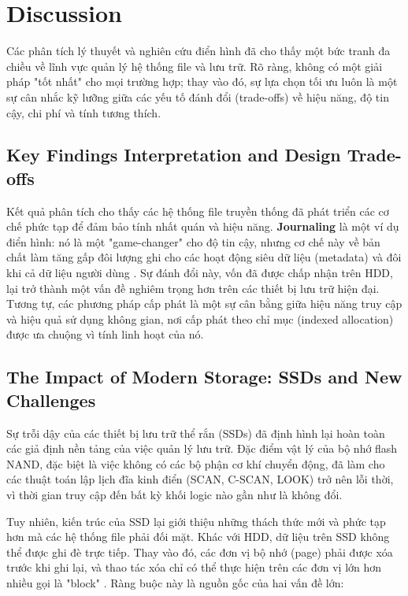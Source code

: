 \documentclass[12pt]{article}
\begin{document}

\section{Discussion}
Các phân tích lý thuyết và nghiên cứu điển hình đã cho thấy một bức tranh đa chiều về lĩnh vực quản lý hệ thống file và lưu trữ. Rõ ràng, không có một giải pháp "tốt nhất" cho mọi trường hợp; thay vào đó, sự lựa chọn tối ưu luôn là một sự cân nhắc kỹ lưỡng giữa các yếu tố đánh đổi (trade-offs) về hiệu năng, độ tin cậy, chi phí và tính tương thích.

\subsection{Key Findings Interpretation and Design Trade-offs}
Kết quả phân tích cho thấy các hệ thống file truyền thống đã phát triển các cơ chế phức tạp để đảm bảo tính nhất quán và hiệu năng. \textbf{Journaling} là một ví dụ điển hình: nó là một "game-changer" cho độ tin cậy, nhưng cơ chế này về bản chất làm tăng gấp đôi lượng ghi cho các hoạt động siêu dữ liệu (metadata) và đôi khi cả dữ liệu người dùng \parencite{Lu2013Extending}. Sự đánh đổi này, vốn đã được chấp nhận trên HDD, lại trở thành một vấn đề nghiêm trọng hơn trên các thiết bị lưu trữ hiện đại. Tương tự, các phương pháp cấp phát là một sự cân bằng giữa hiệu năng truy cập và hiệu quả sử dụng không gian, nơi cấp phát theo chỉ mục (indexed allocation) được ưa chuộng vì tính linh hoạt của nó.

\subsection{The Impact of Modern Storage: SSDs and New Challenges}
Sự trỗi dậy của các thiết bị lưu trữ thể rắn (SSDs) đã định hình lại hoàn toàn các giả định nền tảng của việc quản lý lưu trữ. Đặc điểm vật lý của bộ nhớ flash NAND, đặc biệt là việc không có các bộ phận cơ khí chuyển động, đã làm cho các thuật toán lập lịch đĩa kinh điển (SCAN, C-SCAN, LOOK) trở nên lỗi thời, vì thời gian truy cập đến bất kỳ khối logic nào gần như là không đổi.

Tuy nhiên, kiến trúc của SSD lại giới thiệu những thách thức mới và phức tạp hơn mà các hệ thống file phải đối mặt. Khác với HDD, dữ liệu trên SSD không thể được ghi đè trực tiếp. Thay vào đó, các đơn vị bộ nhớ (page) phải được xóa trước khi ghi lại, và thao tác xóa chỉ có thể thực hiện trên các đơn vị lớn hơn nhiều gọi là "block" \parencite{Viking2017AN0035, Lu2013Extending}. Ràng buộc này là nguồn gốc của hai vấn đề lớn:
\end{document}
